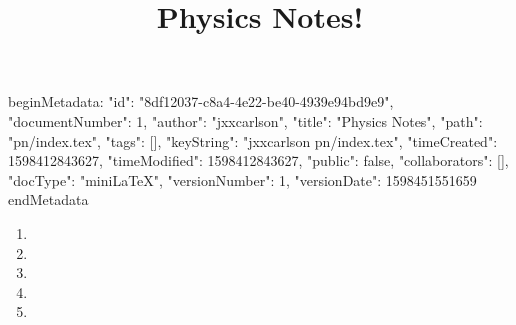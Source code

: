 beginMetadata:
{
    "id": "8df12037-c8a4-4e22-be40-4939e94bd9e9",
    "documentNumber": 1,
    "author": "jxxcarlson",
    "title": "Physics Notes",
    "path": "pn/index.tex",
    "tags": [],
    "keyString": "jxxcarlson pn/index.tex",
    "timeCreated": 1598412843627,
    "timeModified": 1598412843627,
    "public": false,
    "collaborators": [],
    "docType": "miniLaTeX",
    "versionNumber": 1,
    "versionDate": 1598451551659
}
endMetadata
\title{Physics Notes!}

\maketitle

\begin{enumerate}

\item {}

\item {}

\item {}

\item {}

\item {}


\end{enumerate}
